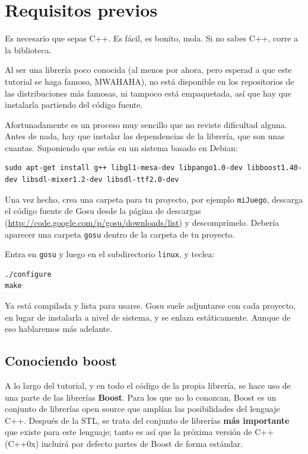 \documentclass{article}
\begin{document}
\section{Requisitos previos}
Es necesario que sepas C++. Es fácil, es bonito, mola. Si no sabes
C++, corre a la biblioteca.

Al ser una librería poco conocida (al menos por ahora, pero esperad a
que este tutorial se haga famoso, MWAHAHA), no está disponible en los
repositorios de las distribuciones más famosas, ni tampoco está
empaquetada, así que hay que instalarla partiendo del código fuente.

Afortunadamente es un proceso muy sencillo que no reviste dificultad
alguna. Antes de nada, hay que instalar las dependencias de la
librería, que son unas cuantas. Suponiendo que estás en un sistema
basado en Debian:


\begin{lstlisting}[style=consola]
sudo apt-get install g++ libgl1-mesa-dev libpango1.0-dev libboost1.40-dev libsdl-mixer1.2-dev libsdl-ttf2.0-dev
\end{lstlisting}

Una vez hecho, crea una carpeta para tu proyecto, por ejemplo
\texttt{miJuego}, descarga el código fuente de Gosu desde la página de
descargas (\url{http://code.google.com/p/gosu/downloads/list}) y
descomprímelo. Debería aparecer una carpeta \texttt{gosu} dentro de la
carpeta de tu proyecto.

Entra en \texttt{gosu} y luego en el subdirectorio \texttt{linux}, y
teclea:
\begin{lstlisting}[style=consola]
./configure
make
\end{lstlisting}

Ya está compilada y lista para usarse. Gosu suele adjuntarse con cada
proyecto, en lugar de instalarla a nivel de sistema, y se enlaza
estáticamente. Aunque de eso hablaremos más adelante.

\subsection{Conociendo boost}
A lo largo del tutorial, y en todo el código de la propia librería, se
hace uso de una parte de las librerías \textbf{Boost}. Para los que no
lo conozcan, Boost es un conjunto de librerías open source que amplían
las posibilidades del lenguaje C++. Después de la STL, se trata del
conjunto de librerías \textbf{más importante} que existe para este
lenguaje; tanto es así que la próxima versión de C++ (C++0x) incluirá
por defecto partes de Boost de forma estándar.
\end{document}

